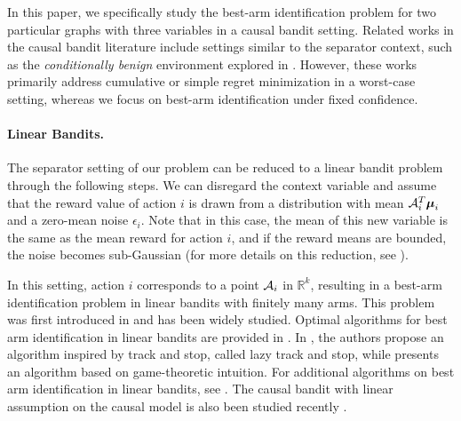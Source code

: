 In this paper, we specifically study the best-arm identification problem for two particular graphs with three variables in a causal bandit setting. Related works in the causal bandit literature include settings similar to the separator context, such as the \textit{conditionally benign} environment explored in \cite{causal-benign-bilodeau2022adaptively, causal-pareto-liu2024causal}. However, these works primarily address cumulative or simple regret minimization in a worst-case setting, whereas we focus on best-arm identification under fixed confidence.


\paragraph{Linear Bandits.}
The separator setting of our problem can be reduced to a linear bandit problem through the following steps. We can disregard the context variable and assume that the reward value of action $i$ is drawn from a distribution with mean $\mathcal{A}_i^T \boldsymbol{\mu}_i$ and a zero-mean noise $\epsilon_i$. Note that in this case, the mean of this new variable is the same as the mean reward for action $i$, and if the reward means are bounded, the noise becomes sub-Gaussian (for more details on this reduction, see \cite{causal-pareto-liu2024causal}). 

In this setting, action $i$ corresponds to a point $\mathcal{A}_i$ in $\mathbb{R}^k$, resulting in a best-arm identification problem in linear bandits with finitely many arms. This problem was first introduced in \cite{linear-bai-soare2014best} and has been widely studied. Optimal algorithms for best arm identification in linear bandits are provided in \cite{linear-lazy-jedra2020optimal, linear-degenne2020gamification, linear-mohammadi22improved}. In \cite{linear-lazy-jedra2020optimal}, the authors propose an algorithm inspired by track and stop, called lazy track and stop, while \cite{linear-degenne2020gamification} presents an algorithm based on game-theoretic intuition. For additional algorithms on best arm identification in linear bandits, see \cite{linear-elimination-xu2018fully, linear-transductive-fiez2019sequential}. The causal bandit with linear assumption on the causal model is also been studied recently \cite{causal-linear1-varici2023causal, causal-linear2-yan2024robust}. 

